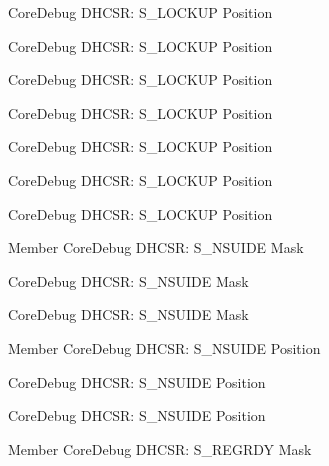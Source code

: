 \begin{DoxyRefList}
\label{deprecated__deprecated000309}%
%
Core\+Debug DHCSR\+: S\+\_\+\+LOCKUP Position 

\label{deprecated__deprecated000574}%
%
Core\+Debug DHCSR\+: S\+\_\+\+LOCKUP Position 

\label{deprecated__deprecated000021}%
%
Core\+Debug DHCSR\+: S\+\_\+\+LOCKUP Position 

\label{deprecated__deprecated000167}%
%
Core\+Debug DHCSR\+: S\+\_\+\+LOCKUP Position 

\label{deprecated__deprecated000252}%
%
Core\+Debug DHCSR\+: S\+\_\+\+LOCKUP Position 

\label{deprecated__deprecated000113}%
%
Core\+Debug DHCSR\+: S\+\_\+\+LOCKUP Position 

\label{deprecated__deprecated000385}%
%
Core\+Debug DHCSR\+: S\+\_\+\+LOCKUP Position  
\item[Member \doxylink{group__CMSIS__SCB_gabe0164afd9f6b8800fb7e05280e0ecda}{Core\+Debug\+\_\+\+DHCSR\+\_\+\+S\+\_\+\+NSUIDE\+\_\+\+Msk} ]\label{deprecated__deprecated000469}%
%
Core\+Debug DHCSR\+: S\+\_\+\+NSUIDE Mask 

\label{deprecated__deprecated000018}%
%
Core\+Debug DHCSR\+: S\+\_\+\+NSUIDE Mask 

\label{deprecated__deprecated000571}%
%
Core\+Debug DHCSR\+: S\+\_\+\+NSUIDE Mask  
\item[Member \doxylink{group__CMSIS__SCB_ga59e228c682eec72e892b2ce018afe477}{Core\+Debug\+\_\+\+DHCSR\+\_\+\+S\+\_\+\+NSUIDE\+\_\+\+Pos} ]\label{deprecated__deprecated000468}%
%
Core\+Debug DHCSR\+: S\+\_\+\+NSUIDE Position 

\label{deprecated__deprecated000017}%
%
Core\+Debug DHCSR\+: S\+\_\+\+NSUIDE Position 

\label{deprecated__deprecated000570}%
%
Core\+Debug DHCSR\+: S\+\_\+\+NSUIDE Position  
\item[Member \doxylink{group__CMSIS__CoreDebug_gac4cd6f3178de48f473d8903e8c847c07}{Core\+Debug\+\_\+\+DHCSR\+\_\+\+S\+\_\+\+REGRDY\+\_\+\+Msk} ]\label{deprecated__deprecated000316}%
%
Core\+Debug DHCSR\+: S\+\_\+\+REGRDY Mask 


\end{DoxyRefList}
